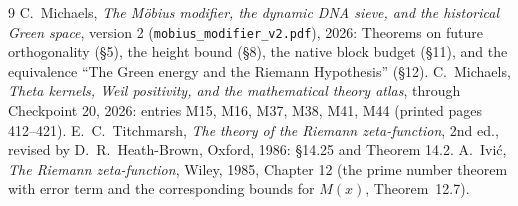 \documentclass[11pt]{article}
\theoremstyle{definition}
\theoremstyle{remark}
\begin{document}
\begin{thebibliography}{9}
 C.~Michaels, \emph{The M\"obius modifier, the dynamic DNA sieve, and the historical Green space}, version 2 (\texttt{mobius\_modifier\_v2.pdf}), 2026: Theorems on future orthogonality (\S5), the height bound (\S8), the native block budget (\S11), and the equivalence ``The Green energy and the Riemann Hypothesis'' (\S12).
 C.~Michaels, \emph{Theta kernels, Weil positivity, and the mathematical theory atlas}, through Checkpoint 20, 2026: entries M15, M16, M37, M38, M41, M44 (printed pages 412--421).
 E.~C.~Titchmarsh, \emph{The theory of the Riemann zeta-function}, 2nd ed., revised by D.~R.~Heath-Brown, Oxford, 1986: \S14.25 and Theorem 14.2.
 A.~Ivi\'c, \emph{The Riemann zeta-function}, Wiley, 1985, Chapter 12 (the prime number theorem with error term and the corresponding bounds for $M(x)$, Theorem~12.7).
\end{thebibliography}
\end{document}
